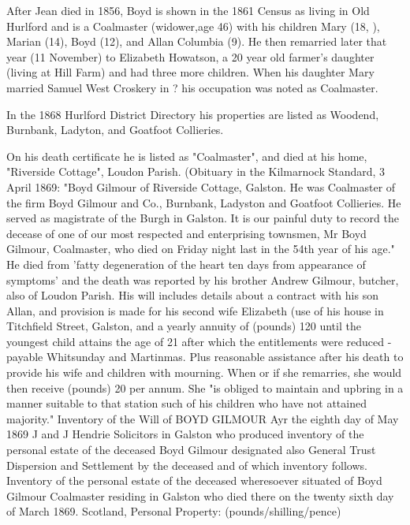 After Jean died in 1856, Boyd is shown in the 1861 Census as living in Old Hurlford and is a Coalmaster (widower,age 46) with his children Mary (18, ), Marian (14), Boyd (12), and Allan Columbia (9). He then remarried later that year (11 November) to Elizabeth Howatson, a 20 year old farmer's daughter (living at Hill Farm) and had three more children.
When his daughter Mary married Samuel West Croskery in ? his occupation was noted as Coalmaster.

In the 1868 Hurlford District Directory his properties are listed as Woodend, Burnbank, Ladyton, and Goatfoot Collieries.

On his death certificate he is listed as "Coalmaster", and died at his home, "Riverside Cottage", Loudon Parish. (Obituary in the Kilmarnock Standard, 3 April 1869:  "Boyd Gilmour of Riverside Cottage, Galston. He was Coalmaster of the firm Boyd Gilmour and Co., Burnbank, Ladyston and Goatfoot Collieries. He served as magistrate of the Burgh in Galston. It is our painful duty to record the decease of one of our most respected and enterprising townsmen, Mr Boyd Gilmour, Coalmaster, who died on Friday night last in the 54th year of his age." 
  He died from 'fatty degeneration of the heart ten days from appearance of symptoms' and the death was reported by his brother Andrew Gilmour, butcher, also of Loudon Parish. His will includes details about a contract with his son Allan, and provision is made for his second wife Elizabeth (use of his house in Titchfield Street, Galston, and a yearly annuity of (pounds) 120 until the youngest child attains the age of 21 after which the entitlements were reduced - payable Whitsunday and Martinmas. Plus reasonable assistance after his death to provide his wife and children with mourning. When or if she remarries, she would then receive (pounds) 20 per annum. She "is obliged to maintain and upbring in a manner suitable to that station such of his children who have not attained majority."      Inventory of the Will of BOYD GILMOUR
    Ayr the eighth day of May 1869 J and J Hendrie Solicitors in Galston who produced inventory of the personal estate of the deceased Boyd Gilmour designated also General Trust Dispersion and Settlement by the deceased and of which inventory follows.
    Inventory of the personal estate of the deceased wheresoever situated of Boyd Gilmour Coalmaster residing in Galston who died there on the twenty sixth day of March 1869.
    Scotland, Personal Property:
    (pounds/shilling/pence)


